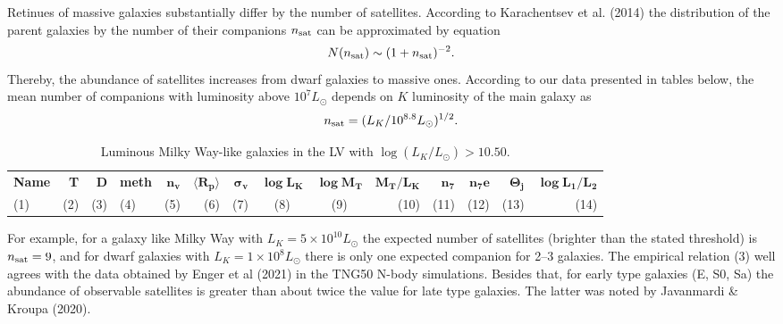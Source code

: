 \documentclass[proof]{WileyASNA-v1}
\begin{document}
Retinues of massive galaxies substantially differ by the number of satellites.
According to Karachentsev et al. (2014) the distribution of the parent galaxies
by the number of their companions $n_{\rm sat}$ can be approximated by equation
\begin{equation}
N(n_{\rm sat})\sim (1+n_{\rm sat})^{-2}.
\end{equation}
Thereby, the abundance of satellites increases from dwarf galaxies to massive
ones. According to our data presented in tables below, the mean number of
companions with luminosity above $10^7L_{\odot}$ depends on $K$ luminosity of
the main galaxy as
\begin{equation}
n_{\rm sat}=(L_K/10^{8.8}L_{\odot})^{1/2}.
\end{equation}

\begin{center}
\begin{table*}[t]%
\caption{Luminous Milky Way-like galaxies in the LV with $\log(L_K/L_{\odot}) > 10.50$.\label{tab1}}
\centering
\begin{tabular*}{500pt}{@{\extracolsep\fill}lrrlrrrccrrrrr@{\extracolsep\fill}}
\toprule
\textbf{Name} & \textbf{T} & \textbf{D} & \textbf{meth} & $\boldsymbol{n_v}$ &
    $\boldsymbol{\langle R_p\rangle}$ & $\boldsymbol{\sigma_v}$ &
    $\boldsymbol{\log L_K}$ & $\boldsymbol{\log M_T}$ & $\boldsymbol{M_T/L_K}$ &
    $\boldsymbol{n_7}$ & $\boldsymbol{n_7e}$ & $\boldsymbol{\Theta_j}$ &
    $\boldsymbol{\log L_1/L_2}$ \\
(1) &(2)& (3) & (4) &(5) & (6) & (7) & (8) & (9) & (10) & (11)&(12) &(13) & (14)\\
\midrule

\bottomrule
\end{tabular*}
\end{table*}
\end{center}

For example, for a galaxy like Milky Way with $L_K= 5\times 10^{10} L_{\odot}$
the expected number of satellites (brighter than the stated threshold) is
$n_{\rm sat} = 9$, and for dwarf galaxies with $L_K= 1\times10^8L_{\odot}$ there
is only one expected companion for 2--3 galaxies. The empirical relation (3)
well agrees with the data obtained by Enger et al (2021) in the TNG50 N-body
simulations. Besides that, for early type galaxies (E, S0, Sa) the abundance of
observable satellites is greater than about twice the value for late type
galaxies. The latter was noted by Javanmardi \& Kroupa (2020).
\end{document}
